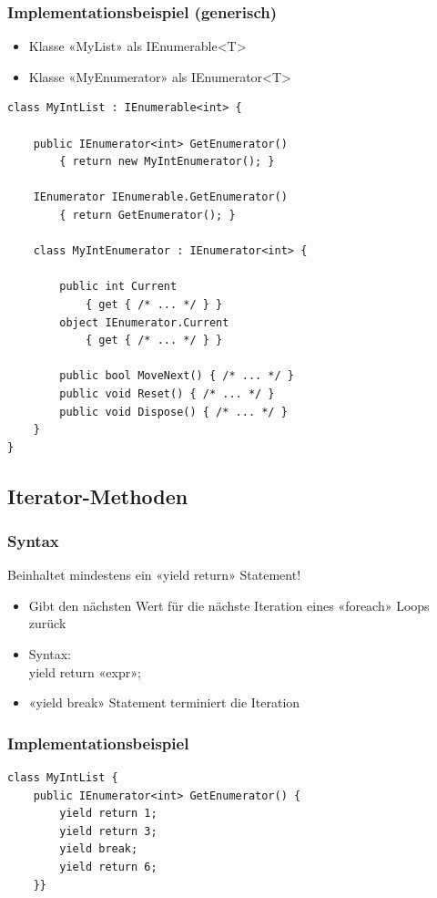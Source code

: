 \subsubsection{Implementationsbeispiel (generisch)}
\begin{itemize}
    \item Klasse «MyList» als IEnumerable<T>
    \item Klasse «MyEnumerator» als IEnumerator<T>
\end{itemize}
\begin{lstlisting}
class MyIntList : IEnumerable<int> {

    public IEnumerator<int> GetEnumerator()
        { return new MyIntEnumerator(); }

    IEnumerator IEnumerable.GetEnumerator()
        { return GetEnumerator(); }

    class MyIntEnumerator : IEnumerator<int> {

        public int Current
            { get { /* ... */ } }
        object IEnumerator.Current
            { get { /* ... */ } }

        public bool MoveNext() { /* ... */ }
        public void Reset() { /* ... */ }
        public void Dispose() { /* ... */ }
    }
}
\end{lstlisting}

\subsection{Iterator-Methoden}
\subsubsection{Syntax}
Beinhaltet mindestens ein «yield return» Statement!
\begin{itemize}
    \item Gibt den nächsten Wert für die nächste Iteration eines «foreach» Loops zurück
    \item Syntax:\\
    yield return «expr»;
    \item «yield break» Statement terminiert die Iteration

\end{itemize}
\subsubsection{Implementationsbeispiel}
\begin{lstlisting}
class MyIntList {
    public IEnumerator<int> GetEnumerator() {
        yield return 1;
        yield return 3;
        yield break;
        yield return 6;
    }}
\end{lstlisting}

